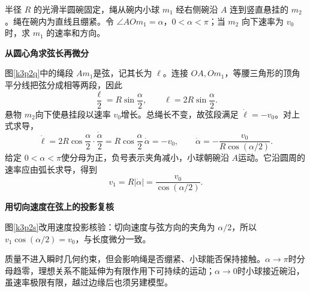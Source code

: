 \begin{question}\begin{example}[碗内小球与弦长]\label{k3p2}
半径 $R$ 的光滑半圆碗固定，绳从碗内小球 $m_1$ 经右侧碗沿 $A$ 连到竖直悬挂的 $m_2$。绳在碗内为直线且绷紧。令 $\angle AOm_1=\alpha$，$0<\alpha<\pi$；当 $m_2$ 向下速率为 $v_0$ 时，求 $m_1$ 的速率和方向。\end{example}
\end{question}
\begin{solution}\textbf{从圆心角求弦长再微分}\par\nobreak
图\ref{k3p2q}中的绳段 $Am_1$是弦，记其长为 $\ell$。连接 $OA,Om_1$，等腰三角形的顶角平分线把弦分成相等两段，因此
\[
 \frac{\ell}{2}=R\sin\frac\alpha2,
 \qquad \ell=2R\sin\frac\alpha2.
\]
悬物 $m_2$向下使悬挂段以速率 $v_0$增长。总绳长不变，故弦段满足 $\dot\ell=-v_0$。对上式求导，
\[
 \dot\ell=2R\cos\frac\alpha2\cdot\frac{\dot\alpha}{2}
 =R\cos\frac\alpha2\,\dot\alpha=-v_0,
 \qquad \dot\alpha=-\frac{v_0}{R\cos(\alpha/2)}.
\]
给定 $0<\alpha<\pi$使分母为正，负号表示夹角减小，小球朝碗沿 $A$运动。它沿圆周的速率应由弧长求导，得到
\[
 v_1=R|\dot\alpha|=\boxed{\frac{v_0}{\cos(\alpha/2)}}.
\]



\par\medskip{}\noindent\textbf{用切向速度在弦上的投影复核}\par\nobreak
图\ref{k3p2s}改用速度投影核验：切向速度与弦方向的夹角为 $\alpha/2$，所以 $v_1\cos(\alpha/2)=v_0$，与长度微分一致。

质量不进入瞬时几何约束，但会影响绳是否绷紧、小球能否保持接触。$\alpha\to\pi$时分母趋零，理想关系不能延伸为有限作用下可持续的运动；$\alpha\to0$时小球接近碗沿，虽速率极限有限，越过边缘后也须另建模型。
\end{solution}

